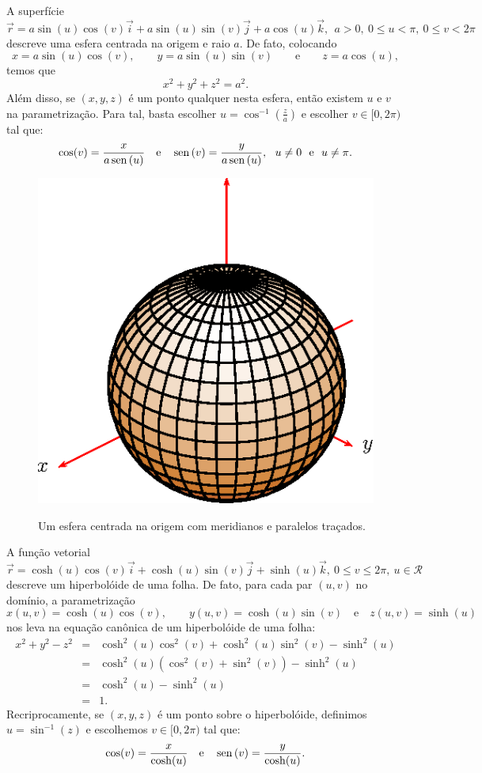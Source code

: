 \begin{ex}A superfície
$$
\vec{r}=a\sin(u)\cos(v)\vec{i}+a\sin(u)\sin(v)\vec{j}+a\cos(u)\vec{k},~~ a>0, ~ 0\leq u< \pi, ~ 0\leq v< 2\pi
$$
descreve uma esfera centrada na origem e raio $a$. De fato, colocando $$x=a\sin(u)\cos(v),\qquad y=a\sin(u)\sin(v)\qquad\text{e}\qquad z=a\cos(u),$$
temos que
$$
x^2+y^2+z^2=a^2.
$$
Além disso, se $(x,y,z)$ é um ponto qualquer nesta esfera, então existem $u$ e $v$ na parametrização. Para tal, basta escolher $u=\cos^{-1}\left(\frac{z}{a}\right)$ e escolher $v\in[0,2\pi)$ tal que:
$$\cos(v)=\frac{x}{a\sin(u)} \quad \hbox{e} \quad \sin(v)=\frac{y}{a\sin(u)},~~u\neq 0 ~~ \hbox{e} ~~u\neq \pi.$$

 \begin{figure}%
\centering
 \includegraphics{cap_superficies/figs/figura_1}\label{cap_superficies_esfera}
\caption{Um esfera centrada na origem com meridianos e paralelos traçados.}
\end{figure}
\end{ex}

\begin{ex}A função vetorial
 $$
 \vec{r}=\cosh(u)\cos( v)\vec{i}+ \cosh(u)\sin(v)\vec{j}+\sinh(u)\vec{k},\ 0\leq v\leq 2\pi,\ u\in\mathcal{R}
 $$
 descreve um hiperbolóide de uma folha. De fato, para cada par $(u,v)$ no domínio, a parametrização
 $$
 x(u,v)=\cosh(u)\cos(v),\qquad y(u,v)=\cosh(u)\sin(v)\quad\text{e}\quad z(u,v)=\sinh(u)
 $$
 nos leva na equação canônica de um hiperbolóide de uma folha:
 \begin{eqnarray*}
 x^2+y^2-z^2&=&\cosh^2(u)\cos^2(v)+\cosh^2(u)\sin^2(v)-\sinh^2(u)  \\
 &=&\cosh^2(u)(\cos^2(v)+\sin^2(v))-\sinh^2(u)  \\
 &=&\cosh^2(u)-\sinh^2(u)  \\
 &=&1.
 \end{eqnarray*}
Recriprocamente, se $(x,y,z)$ é um ponto sobre o hiperbolóide, definimos $u=\sin^{-1}(z)$ e escolhemos $v\in[0,2\pi)$ tal que:
$$\cos(v)=\frac{x}{\cosh(u)} \quad \hbox{e} \quad \sin(v)=\frac{y}{\cosh(u)}.$$
 \end{ex}
 
